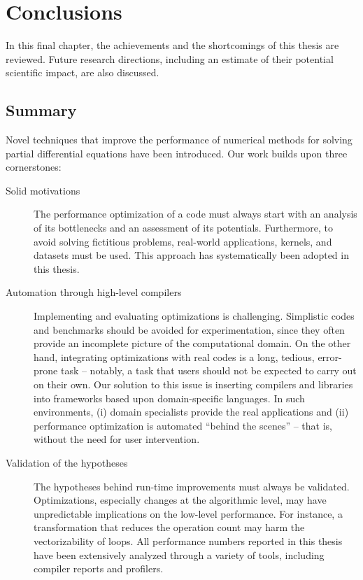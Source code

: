 \chapter{Conclusions}
In this final chapter, the achievements and the shortcomings of this thesis are reviewed. Future research directions, including an estimate of their potential scientific impact, are also discussed. 

\section{Summary}
Novel techniques that improve the performance of numerical methods for solving partial differential equations have been introduced. Our work builds upon three cornerstones:

\begin{description} 
\item[Solid motivations] The performance optimization of a code must always start with an analysis of its bottlenecks and an assessment of its potentials. Furthermore, to avoid solving fictitious problems, real-world applications, kernels, and datasets must be used. This approach has systematically been adopted in this thesis.
\item[Automation through high-level compilers] Implementing and evaluating optimizations is challenging. Simplistic codes and benchmarks should be avoided for experimentation, since they often provide an incomplete picture of the computational domain. On the other hand, integrating optimizations with real codes is a long, tedious, error-prone task -- notably, a task that users should not be expected to carry out on their own. Our solution to this issue is inserting compilers and libraries into frameworks based upon domain-specific languages. In such environments, (i) domain specialists provide the real applications and (ii) performance optimization is automated ``behind the scenes'' -- that is, without the need for user intervention.
\item[Validation of the hypotheses] The hypotheses behind run-time improvements must always be validated. Optimizations, especially changes at the algorithmic level, may have unpredictable implications on the low-level performance. For instance, a transformation that reduces the operation count may harm the vectorizability of loops. All performance numbers reported in this thesis have been extensively analyzed through a variety of tools, including compiler reports and profilers. 
\end{description}


